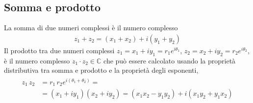 \documentclass[letterpaper,10pt,italian]{jupyterBook}
\begin{document}
\subsection{Somma e prodotto}
\label{\detokenize{ch/algebra/complex-algebra:somma-e-prodotto}}
\sphinxAtStartPar
{} La somma di due numeri complessi è il numero complesso
\begin{equation*}
\begin{split}z_1 + z_2 = (x_1 + x_2) + i(y_1 + y_2)\end{split}
\end{equation*}
\sphinxAtStartPar
{} Il prodotto tra due numeri complessi \(z_1 = x_1 + i y_1 = r_1 e^{i \theta_1}\), \(z_2 = x_2 + i y_2 = r_2 e^{i \theta_2}\), è il numero complesso \(z_1 \cdot z_2 \in \mathbb{C}\) che può essere calcolato usando la proprietà distributiva tra somma e prodotto e la proprietà degli esponenti,
\begin{equation*}
\begin{split}\begin{aligned}
    z_1 \, z_2 
    & = r_1 \, r_2 e^{i(\theta_1 + \theta_2)} = \\
    & = (x_1 + i y_1 ) (x_2 + i y_2) = (x_1 x_2 - y_1 y_2)+i(x_1 y_2 + y_1 x_2) \\
  \end{aligned}\end{split}
\end{equation*}
\end{document}
